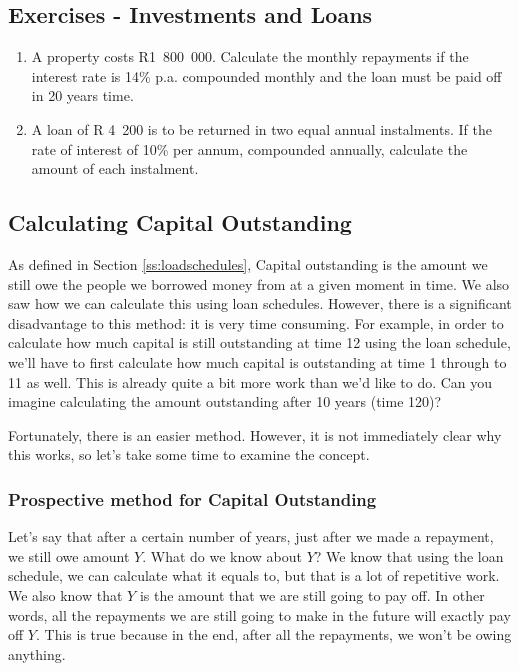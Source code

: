\subsection{Exercises - Investments and Loans}
\begin{enumerate}
\item{A property costs R1~800~000.  Calculate the monthly repayments if the interest rate is 14\% p.a. compounded monthly and the loan must be paid off in 20 years time.}
\item{A loan of R 4~200 is to be returned in two equal annual instalments.  If the rate of interest of 10\% per annum, compounded annually, calculate the amount of each instalment.}
\end{enumerate}


\subsection{Calculating Capital Outstanding}
\label{ss:capitaloutstanding}

As defined in Section \ref{ss:loadschedules}, Capital outstanding is the amount we still owe the people we borrowed money from at a given moment in time. We also saw how we can calculate this using loan schedules. However, there is a significant disadvantage to this method: it is very time consuming. For example, in order to calculate how much capital is still outstanding at time 12 using the loan schedule, we'll have to first calculate how much capital is outstanding at time 1 through to 11 as well. This is already quite a bit more work than we'd like to do. Can you imagine calculating the amount outstanding after 10 years (time 120)?

Fortunately, there is an easier method. However, it is not immediately clear why this works, so let's take some time to examine the concept.

\subsubsection{Prospective method for Capital Outstanding}

Let's say that after a certain number of years, just after we made a repayment, we still owe amount $Y$. What do we know about $Y$? We know that using the loan schedule, we can calculate what it equals to, but that is a lot of repetitive work. We also know that $Y$ is the amount that we are still going to pay off. In other words, all the repayments we are still going to make in the future will exactly pay off $Y$. This is true because in the end, after all the repayments, we won't be owing anything.

